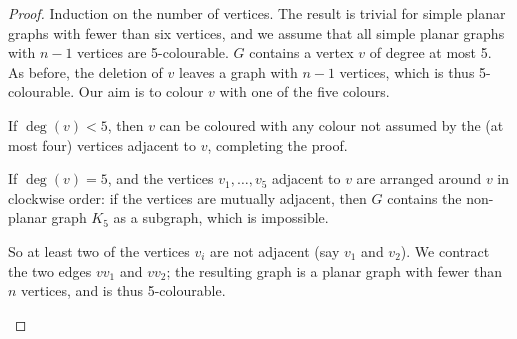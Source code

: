 \begin{proof}
Induction on the number of vertices. The result is trivial for simple planar graphs with fewer than six vertices, and we assume that all simple planar graphs with $n-1$ vertices are 5-colourable. $G$ contains a vertex $v$ of degree at most 5. As before, the deletion of $v$ leaves a graph with $n-1$ vertices, which is thus 5-colourable. Our aim is to colour $v$ with one of the five colours.

If $\deg(v) < 5$, then $v$ can be coloured with any colour not assumed by the (at most four) vertices adjacent to $v$, completing the proof.

If $\deg(v) = 5$, and the vertices $v_1, \dots, v_5$ adjacent to $v$ are arranged around $v$ in clockwise order: if the vertices are mutually adjacent, then $G$ contains the non-planar graph $K_5$ as a subgraph, which is impossible.

\begin{center}
\end{center}

So at least two of the vertices $v_i$ are not adjacent (say $v_1$ and $v_2$). We contract the two edges $vv_1$ and $vv_2$; the resulting graph is a planar graph with fewer than $n$ vertices, and is thus 5-colourable.

\begin{center}
\end{center}
\end{proof}
